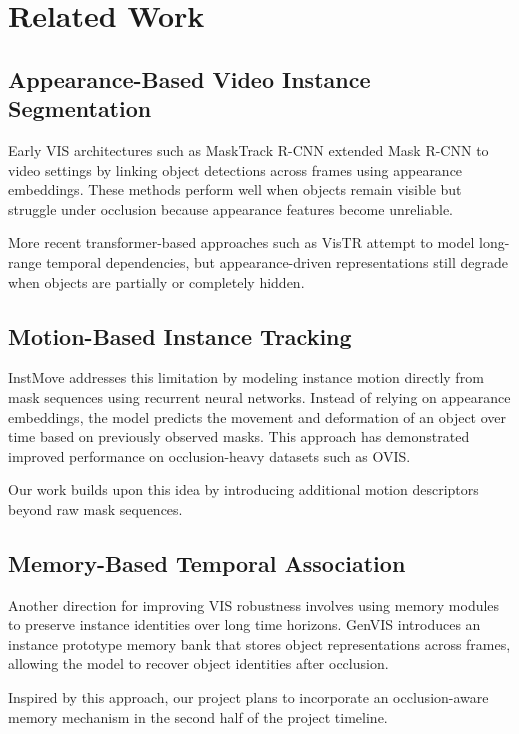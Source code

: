 \documentclass{article}
\begin{document}
\section{Related Work}

\subsection{Appearance-Based Video Instance Segmentation}

Early VIS architectures such as MaskTrack R-CNN \cite{yang2019masktrack} extended Mask R-CNN to video settings by linking object detections across frames using appearance embeddings. These methods perform well when objects remain visible but struggle under occlusion because appearance features become unreliable.

More recent transformer-based approaches such as VisTR \cite{wang2021vistr} attempt to model long-range temporal dependencies, but appearance-driven representations still degrade when objects are partially or completely hidden.

\subsection{Motion-Based Instance Tracking}

InstMove \cite{liu2023instmove} addresses this limitation by modeling instance motion directly from mask sequences using recurrent neural networks. Instead of relying on appearance embeddings, the model predicts the movement and deformation of an object over time based on previously observed masks. This approach has demonstrated improved performance on occlusion-heavy datasets such as OVIS.

Our work builds upon this idea by introducing additional motion descriptors beyond raw mask sequences.

\subsection{Memory-Based Temporal Association}

Another direction for improving VIS robustness involves using memory modules to preserve instance identities over long time horizons. GenVIS \cite{heo2023genvis} introduces an instance prototype memory bank that stores object representations across frames, allowing the model to recover object identities after occlusion.

Inspired by this approach, our project plans to incorporate an occlusion-aware memory mechanism in the second half of the project timeline.
\end{document}
